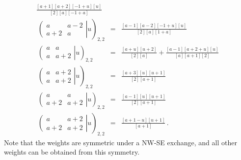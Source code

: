 \documentclass[11pt]{article}
\begin{document}
\begin{eqnarray}
   \frac{[a+1][a+2][-1+u][u]}{[2][a][-1+a]}  \\
         \
   \left. \left( \begin{array}{cc} a & a-2 \\ a+2 & a \end{array} \right| u  \right)_{2,2} &=& 
   \frac{[a-1][a-2][-1+u][u]}{[2][a][1+a]}  \\
      \
   \left. \left( \begin{array}{cc} a & a \\ a & a+2 \end{array} \right| u  \right)_{2,2} &=& 
   \frac{[a+u][u+2]}{[2][a]} + \frac{[a-1][a+2+u][u]}{[a][a+1][2]}  \\
    \
   \left. \left( \begin{array}{cc} a & a+2 \\ a & a+2 \end{array} \right| u  \right)_{2,2} &=& 
   \frac{[a+3][u][u+1]}{[2][a+1]}  \\
    \
   \left. \left( \begin{array}{cc} a & a \\ a+2 & a+2 \end{array} \right| u  \right)_{2,2} &=& 
   \frac{[a-1][u][u+1]}{[2][a+1]}  \\
       \
   \left. \left( \begin{array}{cc} a & a+2 \\ a+2 & a+2 \end{array} \right| u  \right)_{2,2} &=& 
   \frac{[a+1-u][u+1]}{[a+1]} \,.
  \end{eqnarray}
%
Note that the weights are symmetric under a NW-SE exchange, and all other weights can be obtained from this symmetry.
   
\end{document}
